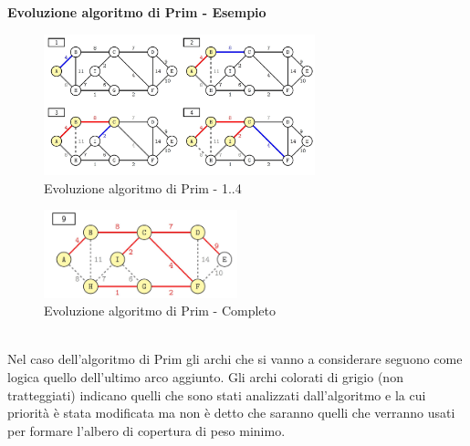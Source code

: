 \documentclass[../cheatSheetAlgoritmi.tex]{subfiles}
\begin{document}
\textbf{Evoluzione algoritmo di Prim - Esempio}
\begin{figure}[h]
	\centering
	\includegraphics[width=0.7\textwidth]{../img/Greedy_9.jpg}
	\caption{Evoluzione algoritmo di Prim - 1..4}
\end{figure}
\begin{figure}[h]
	\centering
	\includegraphics[width=0.5\textwidth]{../img/Greedy_10.jpg}
	\caption{Evoluzione algoritmo di Prim - Completo}
\end{figure} \\
Nel caso dell'algoritmo di Prim gli archi che si vanno a considerare seguono come logica quello dell'ultimo arco aggiunto. Gli archi colorati di grigio (non tratteggiati) indicano quelli che sono stati analizzati dall'algoritmo e la cui priorità è stata modificata ma non è detto che saranno quelli che verranno usati per formare l'albero di copertura di peso minimo.
\newpage
\end{document}
